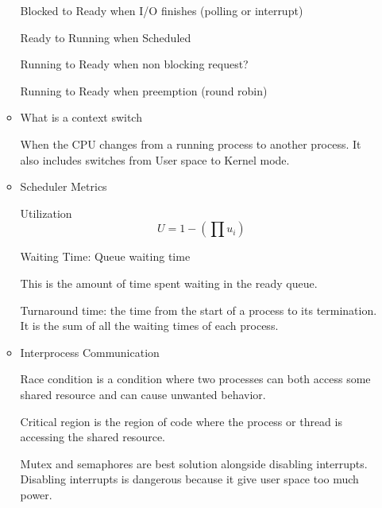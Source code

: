 \documentclass{report}
\begin{document}
\begin{itemize}
\begin{itemize}
\begin{mdframed}
                    Blocked to Ready when I/O finishes (polling or interrupt)

                    Ready to Running when Scheduled

                    Running to Ready when non blocking request?

                    Running to Ready when preemption (round robin)
                \end{mdframed}
            \item What is a context switch
                \begin{mdframed}
                    When the CPU changes from a running process to another
                    process. It also includes switches from User space to Kernel mode.
                \end{mdframed}
            \item Scheduler Metrics
                \begin{mdframed}
                    Utilization
                    \begin{displaymath}
                        U = 1 - (\prod u_i)
                    \end{displaymath}
                    
                    Waiting Time: Queue waiting time

                    This is the amount of time spent waiting in the
                    ready queue.

                    Turnaround time: the time from the start of a process
                    to its termination. It is the sum of all the waiting times
                    of each process.

                \end{mdframed}
            \item Interprocess Communication
                \begin{mdframed}
                    Race condition is a condition where two processes
                    can both access some shared resource and can cause
                    unwanted behavior.

                    Critical region is the region of code where the process
                    or thread is accessing the shared resource.

                    Mutex and semaphores are best solution alongside disabling interrupts.
                    Disabling interrupts is dangerous because it give user space too much power.


\end{mdframed}
\end{itemize}
\end{itemize}
\end{document}
